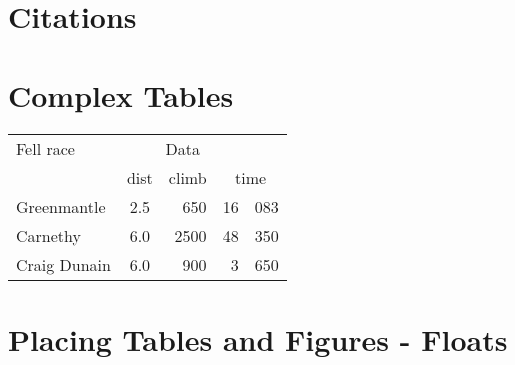 \documentclass[a4paper, 10pt]{article}
\begin{document}
\section{Citations \label{S:Citations}}



\section{Complex Tables \label{S:Complex Tables}}
\begin{center}
\begin{tabular}{l@{\hskip 0.5in}|crr@{.}l|}
\multicolumn{1}{l}{Fell race} &  \multicolumn{3}{c}{Data}\\
\cline{2-5}
& dist & climb & \multicolumn{2}{c|}{time} \\
\cline{2-5}
Greenmantle & 2.5 & 650 & 16 & 083 \\
Carnethy & 6.0 & 2500 & 48 & 350 \\
Craig Dunain & 6.0 & 900 & 3 & 650 \\ \cline{2-5}
\end{tabular}
\end{center}

\section{Placing Tables and Figures - Floats \label{S:Floats}}
\end{document}
